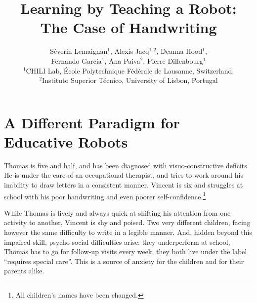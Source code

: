 \documentclass{article}
\title{Learning by Teaching a Robot:\\The Case of Handwriting}
\author{Séverin Lemaignan$^1$, Alexis Jacq$^{1,2}$, Deanna Hood$^1$,\\Fernando
    Garcia$^1$, Ana Paiva$^2$, Pierre Dillenbourg$^1$ \\
$^1$CHILI Lab, École Polytechnique Fédérale de Lausanne, Switzerland,\\
$^2$Instituto Superior Técnico, University of Lisbon, Portugal}
\begin{document}
\maketitle

%
%


\section{A Different Paradigm for Educative Robots}

Thomas is five and half, and has been diagnosed with visuo-constructive
deficits. He is under the care of an occupational therapist, and tries to
work around his inability to draw letters in a consistent manner. Vincent is six
and struggles at school with his poor handwriting and even poorer
self-confidence.\footnote{All children's names have been changed.}

While Thomas is lively and always quick at shifting his attention from one
activity to another, Vincent is shy and poised. Two very different children,
facing however the same difficulty to write in a legible manner. And, hidden
beyond this impaired skill, psycho-social difficulties arise: they underperform
at school, Thomas has to go for follow-up visits every week, they both live
under the label ``requires special care''. This is a source of anxiety for the
children and for their parents alike.
\end{document}
